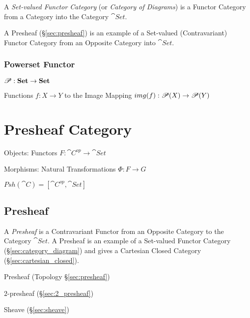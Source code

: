 A \emph{Set-valued Functor Category} (or \emph{Category of Diagrams})
is a Functor Category from a Category into the Category
$\cat{Set}$.

A Presheaf (\S\ref{sec:presheaf}) is an example of a Set-valued
(Contravariant) Functor Category from an Opposite Category into
$\cat{Set}$.



\subsubsection{Powerset Functor}\label{sec:powerset_functor}

$\mathscr{P} : \mathbf{Set} \rightarrow \mathbf{Set}$

Functions $f : X \rightarrow Y$ to the Image Mapping $img(f) :
\mathscr{P}(X) \rightarrow \mathscr{P}(Y)$



\section{Presheaf Category}\label{sec:presheaf_category}

Objects: Functors $F: \cat{C}^{op} \rightarrow \cat{Set}$

Morphisms: Natural Transformations $\Phi : F \rightarrow G$

$Psh(\cat{C}) = [\cat{C}^{op},\cat{Set}]$



\subsection{Presheaf}\label{sec:category_presheaf}

A \emph{Presheaf} is a Contravariant Functor from an Opposite Category
to the Category $\cat{Set}$. A Presheaf is an example of a
Set-valued Functor Category (\S\ref{sec:category_diagram}) and gives a
Cartesian Closed Category (\S\ref{sec:cartesian_closed}).

Presheaf (Topology \S\ref{sec:presheaf})

$2$-presheaf (\S\ref{sec:2_presheaf})

Sheave (\S\ref{sec:sheave})



